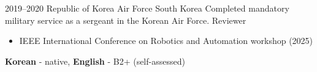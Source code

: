 \documentclass[9pt]{developercv} %
\begin{document}
\begin{entrylist}
    \entry
        {2019--2020} 
        {Republic of Korea Air Force}
        {South Korea}
        {Completed mandatory military service as a sergeant in the Korean Air Force.}
    \entry
		{}
		{Reviewer}
		{}
		{\vspace{-10pt}
        \begin{itemize}
            \item IEEE International Conference on Robotics and Automation workshop (2025)
		\end{itemize}
        }
\end{entrylist}

\vspace{-10 pt}
    \vspace{-6pt}
    
    \hspace{26mm} \textbf{ Korean} - native, \textbf{English} - B2+ (self-assessed)

\end{document}
